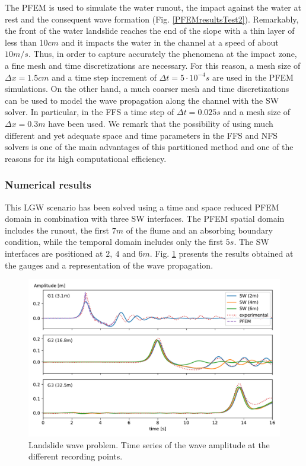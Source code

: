 The PFEM is used to simulate the water runout, the impact against the water at rest and the consequent wave formation (Fig. \ref{PFEMresultsTest2}). Remarkably, the front of the water landslide reaches the end of the slope with a thin layer of less than 10$cm$ and it impacts the water in the channel at a speed of about $10m/s$. Thus, in order to capture accurately the phenomena at the impact zone, a fine mesh and time discretizations are necessary. For this reason, a mesh size of $\Delta x=1.5cm$ and a time step increment of $\Delta t=5\cdot10^{-4}s$ are used in the PFEM simulations. 
On the other hand, a much coarser mesh and time discretizations can be used to model the wave propagation along the channel with the SW solver. In particular, in the FFS a time step of $\Delta t=0.025s$ and a mesh size of $\Delta x=0.3m$ have been used. We remark that the possibility of using much different and yet adequate space and time parameters in the FFS and NFS solvers is one of the main advantages of this partitioned method and one of the reasons for its high computational efficiency.



\subsubsection{Numerical results}

This LGW scenario has been solved using a time and space reduced PFEM domain in combination with three SW interfaces.
The PFEM spatial domain includes the runout, the first $7m$ of the flume and an absorbing boundary condition, while the temporal domain includes only the first $5s$.
The SW interfaces are positioned at $2,\ 4$ and $6m$. Fig. \ref{landslide_wave_propagation} presents the results obtained at the gauges and a representation of the wave propagation.

\begin{figure} [htb]
    \centering
    \includegraphics[width=\textwidth]{img/coupling/landslide_wave_propagation.pdf}
    \caption{Landslide wave problem. Time series of the wave amplitude at the different recording points.}
    \label{landslide_wave_propagation}
\end{figure}


